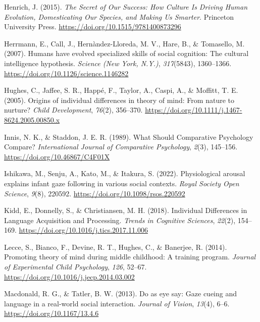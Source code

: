 \documentclass[
]{scrbook}
\newlength{\cslhangindent}
\newenvironment{CSLReferences}[2] %
 {\begin{list}{}{%
  \setlength{\itemindent}{0pt}
  \setlength{\leftmargin}{0pt}
  \setlength{\parsep}{0pt}
  \ifodd #1
   \setlength{\leftmargin}{\cslhangindent}
   \setlength{\itemindent}{-1\cslhangindent}
  \fi
  \setlength{\itemsep}{#2\baselineskip}}}
 {\end{list}}
\begin{document}
\begin{CSLReferences}{1}{0}
Henrich, J. (2015). \emph{The {Secret} of {Our Success}: {How Culture Is Driving Human Evolution}, {Domesticating Our Species}, and {Making Us Smarter}}. Princeton University Press. \url{https://doi.org/10.1515/9781400873296}

Herrmann, E., Call, J., Hernàndez-Lloreda, M. V., Hare, B., \& Tomasello, M. (2007). Humans have evolved specialized skills of social cognition: The cultural intelligence hypothesis. \emph{Science (New York, N.Y.)}, \emph{317}(5843), 1360--1366. \url{https://doi.org/10.1126/science.1146282}

Hughes, C., Jaffee, S. R., Happé, F., Taylor, A., Caspi, A., \& Moffitt, T. E. (2005). Origins of individual differences in theory of mind: From nature to nurture? \emph{Child Development}, \emph{76}(2), 356--370. \url{https://doi.org/10.1111/j.1467-8624.2005.00850.x}

Innis, N. K., \& Staddon, J. E. R. (1989). What {Should Comparative Psychology Compare}? \emph{International Journal of Comparative Psychology}, \emph{2}(3), 145--156. \url{https://doi.org/10.46867/C4F01X}

Ishikawa, M., Senju, A., Kato, M., \& Itakura, S. (2022). Physiological arousal explains infant gaze following in various social contexts. \emph{Royal Society Open Science}, \emph{9}(8), 220592. \url{https://doi.org/10.1098/rsos.220592}

Kidd, E., Donnelly, S., \& Christiansen, M. H. (2018). Individual {Differences} in {Language Acquisition} and {Processing}. \emph{Trends in Cognitive Sciences}, \emph{22}(2), 154--169. \url{https://doi.org/10.1016/j.tics.2017.11.006}

Lecce, S., Bianco, F., Devine, R. T., Hughes, C., \& Banerjee, R. (2014). Promoting theory of mind during middle childhood: {A} training program. \emph{Journal of Experimental Child Psychology}, \emph{126}, 52--67. \url{https://doi.org/10.1016/j.jecp.2014.03.002}

Macdonald, R. G., \& Tatler, B. W. (2013). Do as eye say: {Gaze} cueing and language in a real-world social interaction. \emph{Journal of Vision}, \emph{13}(4), 6--6. \url{https://doi.org/10.1167/13.4.6}


\end{CSLReferences}
\end{document}
